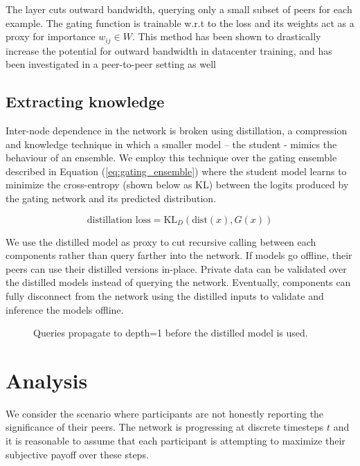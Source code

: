 \documentclass{article}
\begin{document}
The layer cuts outward bandwidth, querying only a small subset of peers for each example. The gating function is trainable w.r.t to the loss and its weights act as a proxy for importance $w_{ij} \in W$. This method has been shown to drastically increase the potential for outward bandwidth in datacenter training,\cite{shazeer2017outrageously} and has been investigated in a peer-to-peer setting as well \cite{Riabinin2020learningathome}


\subsection{Extracting knowledge}

Inter-node dependence in the network is broken using distillation\cite{hinton2015distilling}, a compression and knowledge technique in which a smaller model -- the student - mimics the behaviour of an ensemble. We employ this technique over the gating ensemble described in Equation (\ref{eq:gating_ensemble}) where the student model learns to minimize the cross-entropy (shown below as KL) between the logits produced by the gating network and its predicted distribution. \cite{Sanh2019DistilBERT}

\begin{equation}
\textrm{distillation loss} = \text{KL}_D(\text{dist}(x), G(x)) 
\end{equation}

We use the distilled model as proxy to cut recursive calling between each components rather than query farther into the network. If models go offline, their peers can use their distilled versions in-place. Private data can be validated over the distilled models instead of querying the network. Eventually, components can fully disconnect from the network using the distilled inputs to validate and inference the models offline.

\begin{figure}[H]
	\centering
	\hspace*{0cm}
	
	\caption{Queries propagate to depth=1 before the distilled model is used.}
\end{figure}{}

\section{Analysis}
\label{analysis}

We consider the scenario where participants are not honestly reporting the significance of their peers. The network is progressing at discrete timesteps $t$ and it is reasonable to assume that each participant is attempting to maximize their subjective payoff over these steps.
\end{document}
